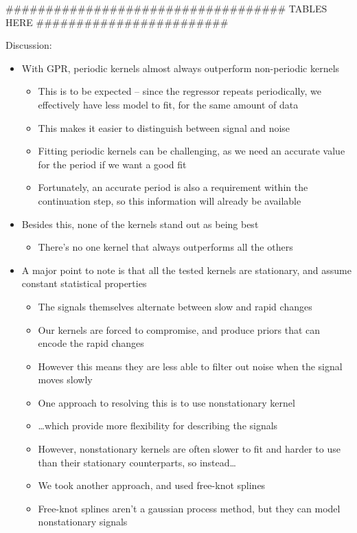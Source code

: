 \documentclass[11pt]{article}
\begin{document}
\#\#\#\#\#\#\#\#\#\#\#\#\#\#\#\#\#\#\#\#\#\#\#\#\#\#\#\#\#\#\#\#\#\#\# TABLES HERE \#\#\#\#\#\#\#\#\#\#\#\#\#\#\#\#\#\#\#\#\#\#\#\#

Discussion:
\begin{itemize}
\item With GPR, periodic kernels almost always outperform non-periodic kernels
\begin{itemize}
\item This is to be expected -- since the regressor repeats periodically, we effectively have less model to fit, for the same amount of data
\item This makes it easier to distinguish between signal and noise
\item Fitting periodic kernels can be challenging, as we need an accurate value for the period if we want a good fit
\item Fortunately, an accurate period is also a requirement within the continuation step, so this information will already be available
\end{itemize}

\item Besides this, none of the kernels stand out as being best
\begin{itemize}
\item There's no one kernel that always outperforms all the others
\end{itemize}

\item A major point to note is that all the tested kernels are stationary, and assume constant statistical properties
\begin{itemize}
\item The signals themselves alternate between slow and rapid changes
\item Our kernels are forced to compromise, and produce priors that can encode the rapid changes
\item However this means they are less able to filter out noise when the signal moves slowly
\item One approach to resolving this is to use nonstationary kernel
\item \ldots{}which provide more flexibility for describing the signals
\item However, nonstationary kernels are often slower to fit and harder to use than their stationary counterparts, so instead\ldots{}
\item We took another approach, and used free-knot splines
\item Free-knot splines aren't a gaussian process method, but they can model nonstationary signals
\end{itemize}


\end{itemize}
\end{document}
